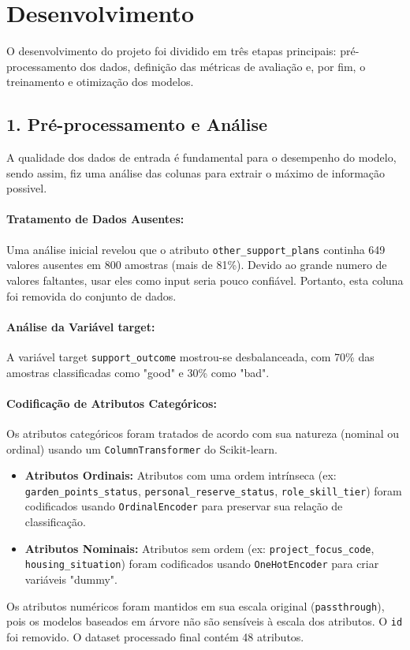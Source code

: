 \section*{Desenvolvimento}

O desenvolvimento do projeto foi dividido em três etapas principais: pré-processamento dos dados, definição das métricas de avaliação e, por fim, o treinamento e otimização dos modelos.

\subsection*{1. Pré-processamento e Análise}
A qualidade dos dados de entrada é fundamental para o desempenho do modelo, sendo assim, fiz uma análise das colunas para extrair o máximo de informação possivel.

\paragraph{Tratamento de Dados Ausentes:} Uma análise inicial revelou que o atributo \texttt{other\_support\_plans} continha 649 valores ausentes em 800 amostras (mais de 81\%).
Devido ao grande numero de valores faltantes, usar eles como input seria pouco confiável.
Portanto, esta coluna foi removida do conjunto de dados.

\paragraph{Análise da Variável target:} A variável target \texttt{support\_outcome} mostrou-se desbalanceada, com 70\% das amostras classificadas como "good" e 30\% como "bad".

\paragraph{Codificação de Atributos Categóricos:} Os atributos categóricos foram tratados de acordo 
com sua natureza (nominal ou ordinal) usando um \texttt{ColumnTransformer} do Scikit-learn.
\begin{itemize}
    \item \textbf{Atributos Ordinais:} Atributos com uma ordem intrínseca (ex: \texttt{garden\_points\_status}, \texttt{personal\_reserve\_status}, \texttt{role\_skill\_tier}) foram codificados usando \texttt{OrdinalEncoder} para preservar sua relação de classificação.
    \item \textbf{Atributos Nominais:} Atributos sem ordem (ex: \texttt{project\_focus\_code}, \texttt{housing\_situation}) foram codificados usando \texttt{OneHotEncoder} para criar variáveis "dummy".
\end{itemize}
Os atributos numéricos foram mantidos em sua escala original (\texttt{passthrough}), pois os modelos baseados em árvore não são sensíveis à escala dos atributos. O \texttt{id} foi removido. O dataset processado final contém 48 atributos.
\vspace{10mm}
